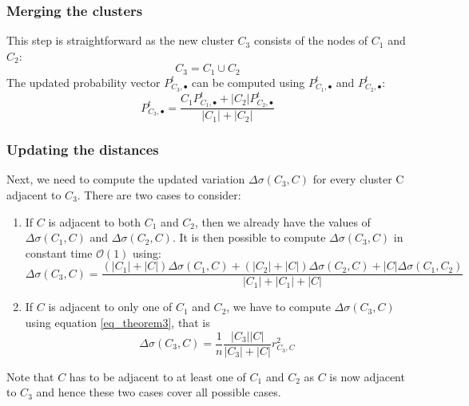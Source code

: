 \documentclass[12pt]{article}
\theoremstyle{definition}
\begin{document}
\subsubsection{Merging the clusters}
This step is straightforward as the new cluster $C_3$ consists of the nodes of $C_1$ and $C_2$:
\[ C_3 = C_1 \cup C_2 \]
The updated probability vector $P_{C_3,\bullet}^t$ can be computed using $P_{C_1,\bullet}^t$ and $P_{C_2,\bullet}^t$:
\begin{equation}
\label{eq_update_P_t}
P_{C_3,\bullet}^t = \frac{C_1 P_{C_1,\bullet}^t + |C_2| P_{C_2,\bullet}^t}{|C_1| + |C_2|}
\end{equation}

\subsubsection{Updating the distances}
Next, we need to compute the updated variation $\Delta\sigma(C_3, C)$ for every  cluster C adjacent to $C_3$. There are two cases to consider:
\begin{enumerate}
	\item If $C$ is adjacent to both $C_1$ and $C_2$, then we already have the values of $\Delta\sigma(C_1, C)$ and $\Delta\sigma(C_2, C)$. It is then possible to compute $\Delta\sigma(C_3, C)$ in constant time $\mathcal{O}(1)$ using:
	\begin{equation}
	\label{eq_theorem4}
	\Delta\sigma(C_3, C) = \frac{(|C_1| + |C|) \Delta\sigma(C_1,C) + (|C_2| + |C|) \Delta\sigma(C_2,C) + |C| \Delta\sigma(C_1,C_2)}{|C_1| + |C_1| + |C|}
	\end{equation}
	\item If $C$ is adjacent to only one of $C_1$ and $C_2$, we have to compute $\Delta\sigma(C_3, C)$ using equation \ref{eq_theorem3}, that is
	\begin{equation}
	\label{eq_theorem3}
	\Delta\sigma(C_3,C) = \frac{1}{n}\frac{|C_3||C|}{|C_3| + |C|} r_{C_3,C}^2 
	\end{equation}
\end{enumerate}
Note that $C$ has to be adjacent to at least one of $C_1$ and $C_2$ as $C$ is now adjacent to $C_3$ and hence these two cases cover all possible cases.
\end{document}
